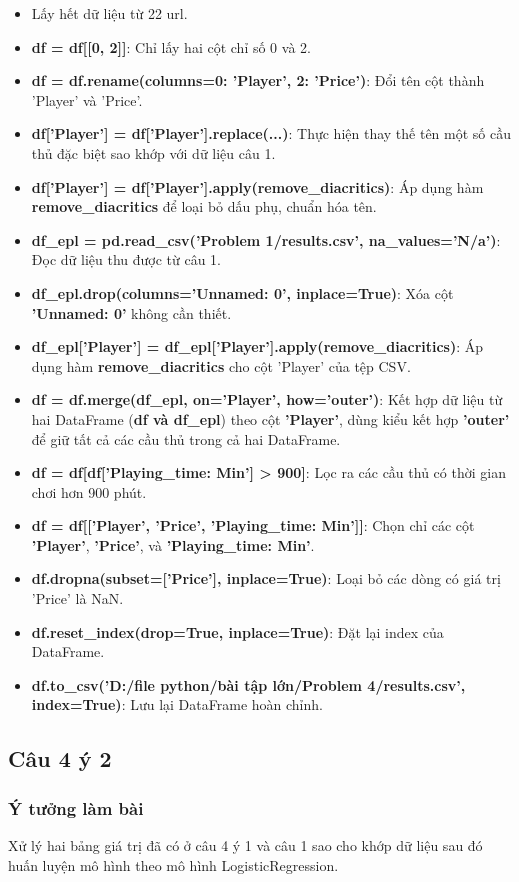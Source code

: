 \documentclass[12pt, letterpaper]{article}
\begin{document}
\begin{itemize}
    \item Lấy hết dữ liệu từ 22 url.
    \item \textbf{df = df[[0, 2]]}: Chỉ lấy hai cột chỉ số 0 và 2.
    \item \textbf{df = df.rename(columns={0: 'Player', 2: 'Price'})}: Đổi tên cột thành 'Player' và 'Price'.
    \item \textbf{df['Player'] = df['Player'].replace(...)}: Thực hiện thay thế tên một số cầu thủ đặc biệt sao khớp với dữ liệu câu 1.
    \item \textbf{df['Player'] = df['Player'].apply(remove\_diacritics)}: Áp dụng hàm \textbf{remove\_diacritics} để loại bỏ dấu phụ, chuẩn hóa tên.
    \item \textbf{df\_epl = pd.read\_csv('Problem 1/results.csv', na\_values='N/a')}: Đọc dữ liệu thu được từ câu 1.
    \item \textbf{df\_epl.drop(columns='Unnamed: 0', inplace=True)}: Xóa cột \textbf{'Unnamed: 0'} không cần thiết.
    \item \textbf{df\_epl['Player'] = df\_epl['Player'].apply(remove\_diacritics)}: Áp dụng hàm \textbf{remove\_diacritics} cho cột 'Player' của tệp CSV.
    \item \textbf{ df = df.merge(df\_epl, on='Player', how='outer')}: Kết hợp dữ liệu từ hai DataFrame (\textbf{df và df\_epl}) theo cột \textbf{'Player'}, dùng kiểu kết hợp \textbf{'outer'} để giữ tất cả các cầu thủ trong cả hai DataFrame.
    \item \textbf{df = df[df['Playing\_time: Min'] > 900]}: Lọc ra các cầu thủ có thời gian chơi hơn 900 phút.
    \item \textbf{df = df[['Player', 'Price', 'Playing\_time: Min']]}: Chọn chỉ các cột \textbf{'Player'}, \textbf{'Price'}, và \textbf{'Playing\_time: Min'}.
    \item \textbf{df.dropna(subset=['Price'], inplace=True)}: Loại bỏ các dòng có giá trị 'Price' là NaN.
    \item \textbf{df.reset\_index(drop=True, inplace=True)}: Đặt lại index của DataFrame.
    \item \textbf{df.to\_csv('D:/file python/bài tập lớn/Problem 4/results.csv', index=True)}: Lưu lại DataFrame hoàn chỉnh.
\end{itemize}
\subsection{Câu 4 ý 2}
\subsubsection{Ý tưởng làm bài}
Xử lý hai bảng giá trị đã có ở câu 4 ý 1 và câu 1 sao cho khớp dữ liệu sau đó huấn luyện mô hình theo mô hình LogisticRegression.
\end{document}
